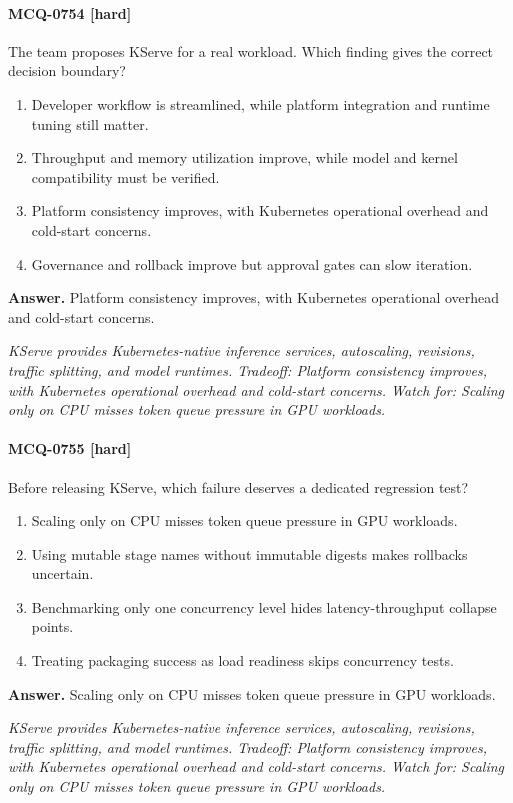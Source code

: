\paragraph{MCQ-0754 [hard]} The team proposes KServe for a real workload. Which finding gives the correct decision boundary?
\begin{enumerate}[label=\Alph*.]
\item Developer workflow is streamlined, while platform integration and runtime tuning still matter.
\item Throughput and memory utilization improve, while model and kernel compatibility must be verified.
\item Platform consistency improves, with Kubernetes operational overhead and cold-start concerns.
\item Governance and rollback improve but approval gates can slow iteration.
\end{enumerate}
\noindent\textbf{Answer.} Platform consistency improves, with Kubernetes operational overhead and cold-start concerns.
\par\textit{KServe provides Kubernetes-native inference services, autoscaling, revisions, traffic splitting, and model runtimes. Tradeoff: Platform consistency improves, with Kubernetes operational overhead and cold-start concerns. Watch for: Scaling only on CPU misses token queue pressure in GPU workloads.}
\paragraph{MCQ-0755 [hard]} Before releasing KServe, which failure deserves a dedicated regression test?
\begin{enumerate}[label=\Alph*.]
\item Scaling only on CPU misses token queue pressure in GPU workloads.
\item Using mutable stage names without immutable digests makes rollbacks uncertain.
\item Benchmarking only one concurrency level hides latency-throughput collapse points.
\item Treating packaging success as load readiness skips concurrency tests.
\end{enumerate}
\noindent\textbf{Answer.} Scaling only on CPU misses token queue pressure in GPU workloads.
\par\textit{KServe provides Kubernetes-native inference services, autoscaling, revisions, traffic splitting, and model runtimes. Tradeoff: Platform consistency improves, with Kubernetes operational overhead and cold-start concerns. Watch for: Scaling only on CPU misses token queue pressure in GPU workloads.}
